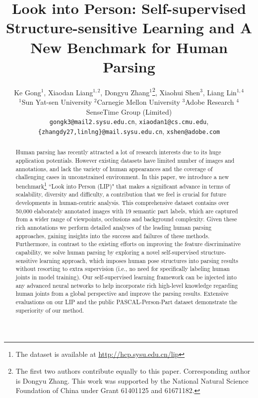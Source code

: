 \documentclass[10pt,twocolumn,letterpaper]{article}
\begin{document}
\title{Look into Person: Self-supervised Structure-sensitive Learning and A New Benchmark for Human Parsing}

\author{Ke Gong$^1$, \quad Xiaodan Liang$^{1,2}$, \quad Dongyu Zhang$^1$\thanks{The first two authors contribute equally to this paper. Corresponding author is Dongyu Zhang.   This work was supported by the National Natural Science Foundation of China under Grant 61401125 and 61671182.}, \quad Xiaohui Shen$^{3}$, \quad Liang Lin$^{1,4}$\\
$^1$Sun Yat-sen University \quad $^2$Carnegie Mellon University \quad $^3$Adobe Research \quad $^4$SenseTime Group (Limited) \\
	{\tt\footnotesize gongk3@mail2.sysu.edu.cn}, {\tt\small xiaodan1@cs.cmu.edu}, {\tt\small \{zhangdy27,linlng\}@mail.sysu.edu.cn}, {\tt\small xshen@adobe.com}
}

\maketitle

\begin{abstract}
Human parsing has recently attracted a lot of research interests due to its huge application potentials. However existing datasets have limited number of images and annotations, and lack the variety of human appearances and the coverage of challenging cases in unconstrained environment. In this paper, we introduce a new benchmark\footnote{The dataset is available at \url{http://hcp.sysu.edu.cn/lip}} ``Look into Person (LIP)" that makes a significant advance in terms of scalability, diversity and difficulty, a contribution that we feel is crucial for future developments in human-centric analysis. This comprehensive dataset contains over 50,000 elaborately  annotated images with 19 semantic part labels, which are captured from a wider range of viewpoints, occlusions and background complexity. Given these rich annotations we perform detailed analyses of the leading human parsing approaches, gaining insights into the success and failures of these methods. Furthermore, in contrast to the existing efforts on improving the feature discriminative capability, we solve human parsing by exploring a novel self-supervised structure-sensitive learning approach, which imposes human pose structures into parsing results without resorting to extra supervision (i.e., no need for specifically labeling human joints in model training). Our self-supervised learning framework can be injected into any advanced neural networks to help incorporate rich high-level knowledge regarding human joints from a global perspective  and improve the parsing results. Extensive evaluations on our LIP and the public PASCAL-Person-Part dataset demonstrate the superiority of our method.
\end{abstract}
\end{document}
